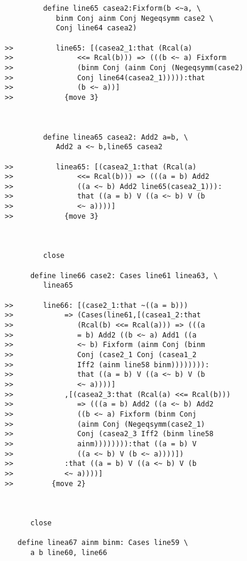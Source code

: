 \documentclass[12pt]{article}
\begin{document}
\begin{verbatim}
         define line65 casea2:Fixform(b <~a, \
            binm Conj ainm Conj Negeqsymm case2 \
            Conj line64 casea2)

>>          line65: [(casea2_1:that (Rcal(a)
>>               <<= Rcal(b))) => (((b <~ a) Fixform
>>               (binm Conj (ainm Conj (Negeqsymm(case2)
>>               Conj line64(casea2_1))))):that
>>               (b <~ a))]
>>            {move 3}



         define linea65 casea2: Add2 a=b, \
            Add2 a <~ b,line65 casea2

>>          linea65: [(casea2_1:that (Rcal(a)
>>               <<= Rcal(b))) => (((a = b) Add2
>>               ((a <~ b) Add2 line65(casea2_1))):
>>               that ((a = b) V ((a <~ b) V (b
>>               <~ a))))]
>>            {move 3}



         close

      define line66 case2: Cases line61 linea63, \
         linea65

>>       line66: [(case2_1:that ~((a = b)))
>>            => (Cases(line61,[(casea1_2:that
>>               (Rcal(b) <<= Rcal(a))) => (((a
>>               = b) Add2 ((b <~ a) Add1 ((a
>>               <~ b) Fixform (ainm Conj (binm
>>               Conj (case2_1 Conj (casea1_2
>>               Iff2 (ainm line58 binm)))))))):
>>               that ((a = b) V ((a <~ b) V (b
>>               <~ a))))]
>>            ,[(casea2_3:that (Rcal(a) <<= Rcal(b)))
>>               => (((a = b) Add2 ((a <~ b) Add2
>>               ((b <~ a) Fixform (binm Conj
>>               (ainm Conj (Negeqsymm(case2_1)
>>               Conj (casea2_3 Iff2 (binm line58
>>               ainm)))))))):that ((a = b) V
>>               ((a <~ b) V (b <~ a))))])
>>            :that ((a = b) V ((a <~ b) V (b
>>            <~ a))))]
>>         {move 2}



      close

   define linea67 ainm binm: Cases line59 \
      a b line60, line66


\end{verbatim}
\end{document}
